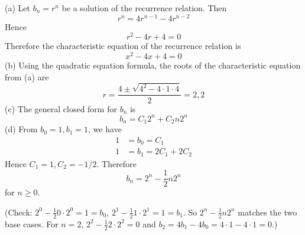 (a) Let $b_n = r^n$ be a solution of the recurrence relation.
Then
\[
r^n = 4 r^{n-1} - 4 r^{n-2}
\]
Hence
\[
r^2 - 4 r + 4 = 0
\]
Therefore the characteristic equation of the recurrence relation
is
\[
x^2 - 4x + 4 = 0
\]
(b)
Using the quadratic equation formula,
the roots of the characteristic equation from (a) are
\[
r = \frac{4 \pm \sqrt{4^2 - 4 \cdot 1 \cdot 4}}{2} = 2, 2
\]
(c)
The general closed form for $b_n$ is
\[
b_n = C_1 2^n + C_2 n2^n
\]
(d) From $b_0 = 1, b_1 = 1$, we have
\begin{align*}
  1 &= b_0 = C_1 \\
  1 &= b_1 = 2C_1 + 2C_2 
\end{align*}
Hence $C_1 = 1, C_2 = -1/2$.
Therefore
\[
b_n = 2^n - \frac{1}{2} n2^n
\]
for $n \geq 0$.

(Check:
$2^0 - \displaystyle\frac{1}{2} 0\cdot 2^0  = 1 = b_0$,
$2^1 - \displaystyle\frac{1}{2} 1\cdot 2^1 = 1 = b_1$.
So $2^n - \displaystyle\frac{1}{2} n2^n$ matches the
two base cases.
For $n = 2$,
$2^2 - \displaystyle\frac{1}{2}  2 \cdot 2^2 = 0$ and
$b_2 = 4b_1 - 4b_0 = 4\cdot 1 - 4\cdot 1 = 0$.)
